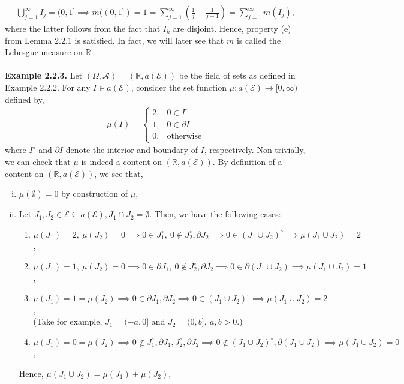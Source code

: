 \documentclass{article}
\begin{document}
\begin{eqnarray}
	\nonumber
	\bigcup_{j=1}^{\infty}I_j = (0,1] \implies m((0,1]) = 1 = \sum_{j=1}^{\infty}\left(\frac{1}{j} - \frac{1}{j+1}\right) = \sum_{j=1}^{\infty}m(I_j),
\end{eqnarray}
where the latter follows from the fact that $I_k$ are disjoint. Hence, property (e) from Lemma 2.2.1 is satisfied. In fact, we will later see that $m$ is called the Lebesgue measure on $\mathbb{R}$. \\\\
\textbf{Example 2.2.3.} Let $(\Omega, \mathcal{A}) = (\mathbb{R}, a(\mathcal{E}))$ be the field of sets as defined in Example 2.2.2. For any $I \in a(\mathcal{E})$, consider the set function $\mu: a(\mathcal{E}) \to [0,\infty)$ defined by,
\begin{eqnarray}
	\nonumber
	\mu(I) =
	\begin{cases}
	2, & 0 \in I^{\circ} \\
	1, & 0 \in \partial I \\
	0, & \text{otherwise}
	\end{cases}
\end{eqnarray}
where $I^{\circ}$ and $\partial I$ denote the interior and boundary of $I$, respectively. Non-trivially, we can check that $\mu$ is indeed a content on $(\mathbb{R}, a(\mathcal{E}))$. By definition of a content on $(\mathbb{R}, a(\mathcal{E}))$, we see that,
\begin{enumerate}[(i)]
	\item $\mu(\emptyset) = 0$ by construction of $\mu$,
	\item Let $J_1, J_2 \in \mathcal{E} \subseteq a(\mathcal{E}), J_1 \cap J_2 = \emptyset$. Then, we have the following cases:
	\begin{enumerate}[1.]
		\item $\mu(J_1) = 2, \ \mu(J_2) = 0 \implies 0 \in J_1^{\circ}, \ 0 \notin J_2^{\circ}, \partial J_2 \implies 0 \in (J_1 \cup J_2)^{\circ} \implies \mu(J_1 \cup J_2) = 2$,
		\item $\mu(J_1) = 1, \ \mu(J_2) = 0 \implies 0 \in \partial J_1, \ 0 \notin J_2^{\circ}, \partial J_2 \implies 0 \in \partial(J_1 \cup J_2) \implies \mu(J_1 \cup J_2) = 1$,
		\item $\mu(J_1) = 1 = \mu(J_2) \implies 0 \in \partial J_1, \partial J_2 \implies 0 \in (J_1 \cup J_2)^{\circ} \implies \mu(J_1 \cup J_2) = 2$, \\(Take for example, $J_1 = (-a,0]$ and $J_2 = (0, b], \ a,b >0$.)
		\item $\mu(J_1) = 0 = \mu(J_2) \implies 0 \notin J_1^{\circ}, \partial J_1, J_2^{\circ}, \partial J_2 \implies 0 \notin (J_1 \cup J_2)^{\circ}, \partial(J_1 \cup J_2) \implies \mu(J_1 \cup J_2) = 0$,
	\end{enumerate}
	Hence, $\mu(J_1 \cup J_2) = \mu(J_1) + \mu(J_2)$,
\end{enumerate}
\end{document}
